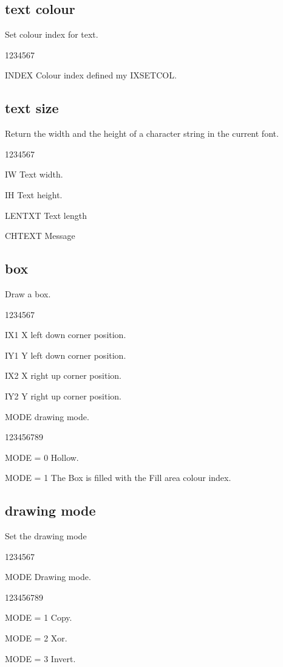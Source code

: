 \subsection{ text colour}
%
\Action
Set colour index for text.
\Pdesc
\begin{DLtt}{1234567}
\item[INDEX] Colour index defined my IXSETCOL.
\end{DLtt}
\subsection{ text size}
%
\Action
Return the width and the height of a character string in the current font.
\Pdesc
\begin{DLtt}{1234567}
\item[IW] Text width.
\item[IH] Text height.
\item[LENTXT] Text length
\item[CHTEXT] Message
\end{DLtt}

\newpage%

\subsection{ box}
%
\Action
Draw a box.
\Pdesc
\begin{DLtt}{1234567}
\item[IX1] X left down corner position.
\item[IY1] Y left down corner position.
\item[IX2] X right up corner position.
\item[IY2] Y right up corner position.
\item[MODE] drawing mode.
\begin{DLtt}{123456789}
\item[MODE = 0 ] Hollow.
\item[MODE = 1 ] The Box is filled with the Fill area colour index.
\end{DLtt}
\end{DLtt}
\subsection{ drawing mode}
%
\Action
Set the drawing mode
\Pdesc
\begin{DLtt}{1234567}
\item[MODE] Drawing mode.
\begin{DLtt}{123456789}
\item[MODE = 1 ] Copy.
\item[MODE = 2 ] Xor.
\item[MODE = 3 ] Invert.
\end{DLtt}
\end{DLtt}
